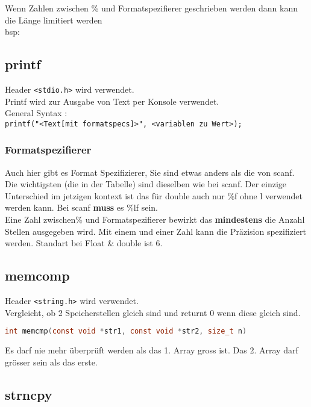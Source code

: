 Wenn Zahlen zwischen \% und Formatspezifierer geschrieben werden dann kann die Länge limitiert werden\\
bsp:



\subsection{printf}

Header \verb|<stdio.h>| wird verwendet.\\
Printf wird zur Ausgabe von Text per Konsole verwendet.\\
General Syntax :\\ 
\verb|printf("<Text[mit formatspecs]>", <variablen zu Wert>);|

\subsubsection{Formatspezifierer}

Auch hier gibt es Format Spezifizierer, Sie sind etwas anders als die von scanf. 
Die wichtigsten (die in der Tabelle) sind dieselben wie bei scanf. 
Der einzige Unterschied im jetzigen kontext ist das für double auch nur \%f ohne l verwendet werden kann. 
Bei scanf \textbf{muss} es \%lf sein.\\
Eine Zahl zwischen\% und Formatspezifierer bewirkt das \textbf{mindestens} die Anzahl Stellen ausgegeben wird. 
Mit einem  und einer Zahl kann die Präzision spezifiziert werden. Standart bei Float \& double ist 6.




\nextcol

\subsection{memcomp}

Header \verb|<string.h>| wird verwendet.\\
Vergleicht, ob 2 Speicherstellen gleich sind und returnt 0 wenn diese gleich sind.
\begin{lstlisting}[language = c]
int memcmp(const void *str1, const void *str2, size_t n)
\end{lstlisting}
Es darf nie mehr überprüft werden als das 1. Array gross ist. Das 2. Array darf grösser sein als das erste.

\subsection{strncpy}

